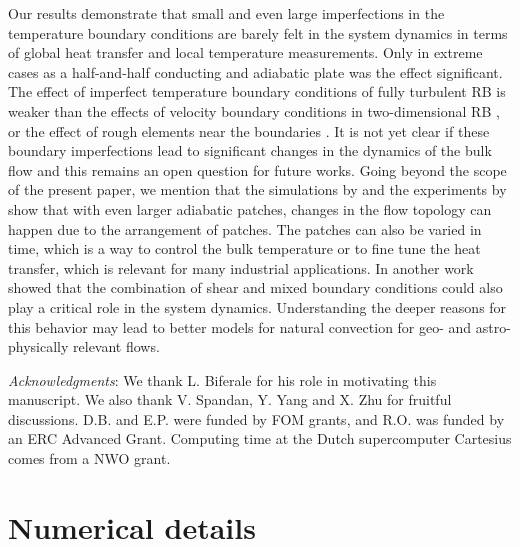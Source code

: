 \documentclass{jfm}
\begin{document}
Our results demonstrate that small and even large imperfections in the
temperature boundary conditions are barely felt in the system dynamics in
terms of global heat transfer and local temperature measurements.  Only in
extreme cases as a half-and-half conducting and adiabatic plate was the effect
significant. The effect of imperfect temperature boundary conditions of fully
turbulent RB is weaker than the effects of velocity boundary conditions in
two-dimensional RB \citep{poe14}, or the effect of rough elements near the
boundaries \citep{tis11}. It is not yet clear if these boundary imperfections
lead to significant changes in the dynamics of the bulk flow and this remains
an open question for future works. Going beyond the scope of
 the present paper, we mention that the simulations 
by \cite{cooper13} and the  experiments by \cite{wang17} show that 
with even larger adiabatic patches, changes in the flow topology can 
happen due to the arrangement of patches. The patches can also be varied in
time, which is a way to control the bulk temperature or to fine tune the heat
transfer, which is relevant for many industrial applications.
In another work \cite{whitehead15}
showed that the combination of shear and mixed boundary conditions could
also play a critical role in the system dynamics. Understanding the deeper
reasons for this behavior may lead to better models for natural convection for
geo- and astro-physically relevant flows.

\emph{Acknowledgments}: We thank L. Biferale for his role in motivating this
manuscript. We also thank V. Spandan, Y. Yang and X. Zhu for fruitful
discussions. D.B. and E.P. were funded by FOM grants, and R.O. was funded by
an ERC Advanced Grant. Computing time at the Dutch supercomputer Cartesius
comes from a NWO grant.





\newpage

\appendix \section{Numerical details}\label{appendixA}
\end{document}
